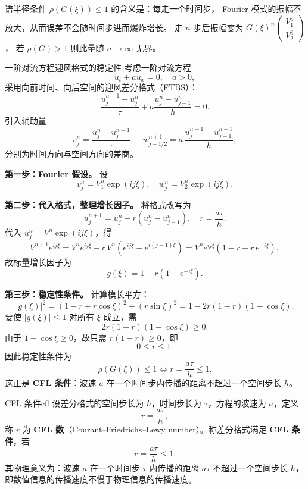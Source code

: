 \begin{note}
谱半径条件 $\rho(G(\xi)) \leq 1$ 的含义是：每走一个时间步，
Fourier 模式的振幅不放大，从而误差不会随时间步进而爆炸增长。
走 $n$ 步后振幅变为 $G(\xi)^n \begin{pmatrix}V_1^0 \\ V_2^0\end{pmatrix}$，
若 $\rho(G) > 1$ 则此量随 $n \to \infty$ 无界。
\end{note}

\begin{example}{一阶对流方程迎风格式的稳定性}
考虑一阶对流方程
\[
u_t + a u_x = 0, \quad a > 0,
\]
采用向前时间、向后空间的迎风差分格式（FTBS）：
\[
\frac{u_j^{n+1} - u_j^n}{\tau} + a\frac{u_j^n - u_{j-1}^n}{h} = 0.
\]
引入辅助量
\[
v_j^n = \frac{u_j^n - u_j^{n-1}}{\tau}, \quad
w_{j-1/2}^{n+1} = a\,\frac{u_j^{n+1} - u_{j-1}^{n+1}}{h},
\]
分别为时间方向与空间方向的差商。

\noindent\textbf{第一步：Fourier 假设。}
设
\[
v_j^n = V_1^n \exp(ij\xi), \quad w_j^n = V_2^n \exp(ij\xi).
\]

\noindent\textbf{第二步：代入格式，整理增长因子。}
将格式改写为
\[
u_j^{n+1} = u_j^n - r\left(u_j^n - u_{j-1}^n\right), \quad r = \frac{a\tau}{h}.
\]
代入 $u_j^n = V^n \exp(ij\xi)$，得
\[
V^{n+1} e^{ij\xi}
= V^n e^{ij\xi} - r\,V^n\left(e^{ij\xi} - e^{i(j-1)\xi}\right)
= V^n e^{ij\xi}\left(1 - r + r\,e^{-i\xi}\right),
\]
故标量增长因子为
\[
g(\xi) = 1 - r\left(1 - e^{-i\xi}\right).
\]

\noindent\textbf{第三步：稳定性条件。}
计算模长平方：
\[
\left|g(\xi)\right|^2
= \left(1 - r + r\cos\xi\right)^2 + \left(r\sin\xi\right)^2
= 1 - 2r(1-r)(1-\cos\xi).
\]
要使 $|g(\xi)| \leq 1$ 对所有 $\xi$ 成立，需
\[
2r(1-r)(1-\cos\xi) \geq 0.
\]
由于 $1 - \cos\xi \geq 0$，故只需 $r(1-r) \geq 0$，即
\[
0 \leq r \leq 1.
\]
因此稳定性条件为
\[
\rho\!\left(G(\xi)\right) \leq 1
\iff
r = \frac{a\tau}{h} \leq 1.
\]
这正是 \textbf{CFL 条件}：波速 $a$ 在一个时间步内传播的距离不超过一个空间步长 $h$。
\end{example}
\begin{definition}{CFL 条件}{cfl}
设差分格式的空间步长为 $h$，时间步长为 $\tau$，方程的波速为 $a$，定义
\[
r = \frac{a\tau}{h},
\]
称 $r$ 为 \textbf{CFL 数}（Courant--Friedrichs--Lewy number）。称差分格式满足 \textbf{CFL 条件}，若
\[
r = \frac{a\tau}{h} \leq 1.
\]
其物理意义为：波速 $a$ 在一个时间步 $\tau$ 内传播的距离 $a\tau$ 不超过一个空间步长 $h$，
即数值信息的传播速度不慢于物理信息的传播速度。
\end{definition}

